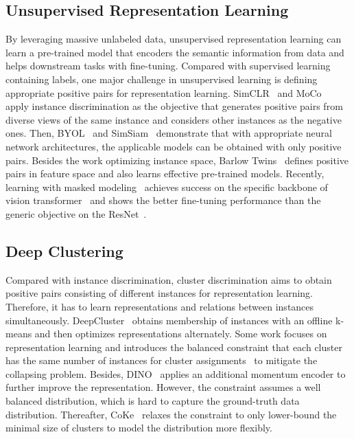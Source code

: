 \documentclass[10pt,twocolumn,letterpaper]{article}
\begin{document}
\subsection{Unsupervised Representation Learning}
By leveraging massive unlabeled data, unsupervised representation learning can learn a pre-trained model that encoders the semantic information from data and helps downstream tasks with fine-tuning. Compared with supervised learning containing labels, one major challenge in unsupervised learning is defining appropriate positive pairs for representation learning. SimCLR~\cite{ChenK0H20} and MoCo~\cite{He0WXG20} apply instance discrimination as the objective that generates positive pairs from diverse views of the same instance and considers other instances as the negative ones. Then, BYOL~\cite{GrillSATRBDPGAP20} and SimSiam~\cite{ChenH21} demonstrate that with appropriate neural network architectures, the applicable models can be obtained with only positive pairs. Besides the work optimizing instance space, Barlow Twins~\cite{ZbontarJMLD21} defines positive pairs in feature space and also learns effective pre-trained models. Recently, learning with masked modeling~\cite{abs-2106-08254,abs-2111-06377} achieves success on the specific backbone of vision transformer~\cite{DosovitskiyB0WZ21} and shows the better fine-tuning performance than the generic objective on the ResNet~\cite{HeZRS16}. 

\subsection{Deep Clustering}
Compared with instance discrimination, cluster discrimination aims to obtain positive pairs consisting of different instances for representation learning. Therefore, it has to learn representations and relations between instances simultaneously. DeepCluster~\cite{CaronBJD18} obtains membership of instances with an offline k-means and then optimizes representations alternately. Some work focuses on representation learning and introduces the balanced constraint that each cluster has the same number of instances for cluster assignments~\cite{AsanoRV20a,CaronMMGBJ20} to mitigate the collapsing problem. Besides, DINO~\cite{CaronTMJMBJ21} applies an additional momentum encoder to further improve the representation. However, the constraint assumes a well balanced distribution, which is hard to capture the ground-truth data distribution. Thereafter, CoKe~\cite{coke} relaxes the constraint to only lower-bound the minimal size of clusters to model the distribution more flexibly.
\end{document}
